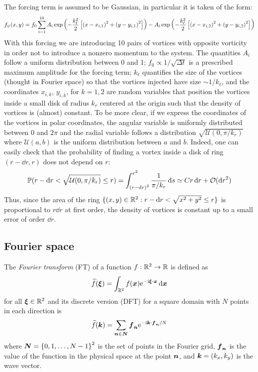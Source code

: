 \documentclass[../main.tex]{subfiles}
\begin{document}
The forcing term is assumed to be Gaussian, in particular it is taken of the form:
\begin{equation}
	f_\psi(x,y) = f_0\sum_{i=1}^{10} A_i \operatorname{exp}\left(-\frac{k_\ell^2}{2}\left[{(x-x_{i,1})}^2 + {(y-y_{i,1})}^2\right]\right) - A_i\operatorname{exp}\left(-\frac{k_\ell^2}{2}\left[{(x-x_{i,2})}^2 + {(y-y_{i,2})}^2\right]\right)
\end{equation}
With this forcing we are introducing 10 pairs of vortices with opposite vorticity in order not to introduce a nonzero momentum to the system. The quantities $A_i$ follow a uniform distribution between 0 and 1; $f_0\propto 1/\sqrt{\Delta t}$ is a prescribed maximum amplitude for the forcing term; $k_\ell$ quantifies the size of the vortices (thought in Fourier space) so that the vortices injected have size $\sim 1/k_\ell$, and the coordinates $x_{i,k}$, $y_{i,k}$, for $k=1,2$ are random variables that position the vortices inside a small disk of radius $k_r$ centered at the origin such that the density of vortices is (almost) constant. To be more clear, if we express the coordinates of the vortices in polar coordinates, the angular variable is uniformly distributed between 0 and $2\pi$ and the radial variable follows a distribution $\sqrt{\mathcal{U}(0,\pi/k_r)}$ where $\mathcal{U}(a,b)$ is the uniform distribution between $a$ and $b$. Indeed, one can easily check that the probability of finding a vortex inside a disk of ring $(r-\dd{r},r)$ does not depend on $r$:
\begin{equation}
	\mathbb{P}(r-\dd{r} < \sqrt{\mathcal{U}(0,\pi/k_r)} \leq r) = \int_{{(r-\dd{r})}^2}^{r^2} \frac{1}{\pi/k_r} \dd{s} \simeq C r \dd{r} + \mathcal{O}(\dd{r}^2)
\end{equation}
Thus, since the area of the ring $\{(x,y) \in \mathbb{R}^2 : r-\dd{r} < \sqrt{x^2+y^2} \leq r\}$ is proportional to $r \dd{r}$ at first order, the density of vortices is constant up to a small error of order $\dd{r}$.
\subsection{Fourier space}
The \emph{Fourier transform} (FT) of a function $f:\mathbb{R}^2 \to \mathbb{R}$ is defined as
\begin{equation}
	\widehat{f}(\boldsymbol{\xi}) = \int_{\mathbb{R}^2} f(\boldsymbol{x}) \mathrm{e}^{-\mathrm{i} \boldsymbol{\xi} \cdot \boldsymbol{x}} \dd{\boldsymbol{x}}
\end{equation}
for all $\boldsymbol{\xi}\in\mathbb{R}^2$ and its discrete version (DFT) for a square domain with $N$ points in each direction is
\begin{equation}
	\widehat{f}(\boldsymbol{k}) = \sum_{\boldsymbol{n}\in\boldsymbol{N}} \boldsymbol{f}_{\boldsymbol{n}} \mathrm{e}^{-\mathrm{i} \boldsymbol{k} \cdot \boldsymbol{f}_{\boldsymbol{n}}/N}
\end{equation}
where $\boldsymbol{N} = {\{0,1,\ldots,N-1\}}^2$ is the set of points in the Fourier grid, $\boldsymbol{f}_{\boldsymbol{n}}$ is the value of the function in the physical space at the point $\boldsymbol{n}$, and $\boldsymbol{k} = (k_x,k_y)$ is the wave vector.
\end{document}
